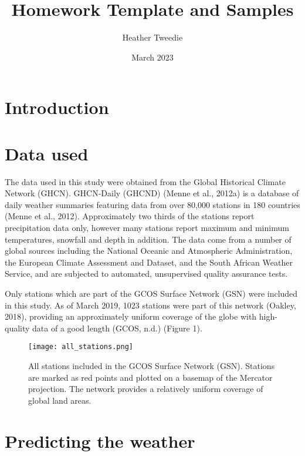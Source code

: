 \documentclass[12pt]{article}
\title{Homework Template and Samples}
\author{Heather Tweedie}
\date{March 2023}
\begin{document}
\markboth{\theauthor}{\thetitle}

\maketitle


\begin{abstract}

\end{abstract}

\section{Introduction}
\section{Data used}

The data used in this study were obtained from the Global Historical Climate Network (GHCN). GHCN-Daily (GHCND) (Menne et al., 2012a) 
is a database of daily weather summaries featuring data from over 80,000 stations in 180 countries (Menne et al., 2012). Approximately 
two thirds of the stations report precipitation data only, however many stations report maximum and minimum temperatures, snowfall and 
depth in addition. The data come from a number of global sources including the National Oceanic and Atmospheric Administration, the 
European Climate Assessment and Dataset, and the South African Weather Service, and are subjected to automated, unsupervised quality 
assurance tests.

Only stations which are part of the GCOS Surface Network (GSN) were included in this study. As of March 2019, 1023 stations were part 
of this network (Oakley, 2018), providing an approximately uniform coverage of the globe with high-quality data of a good length 
(GCOS, n.d.) (Figure 1).

    \begin{figure}
        \centering
        \texttt{[image: all\_stations.png]}
        \caption{All stations included in the GCOS Surface Network (GSN). Stations are marked as red points and plotted on a basemap
         of the Mercator projection. The network provides a relatively uniform coverage of global land areas.}
        \label{fig:my_label}
    \end{figure}

\section{Predicting the weather}
\end{document}
